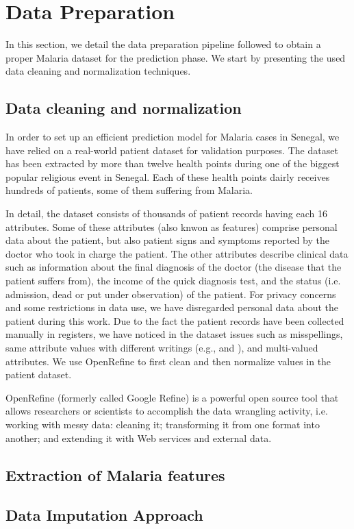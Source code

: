 \section{Data Preparation}\label{data_prep}
In this section, we detail the data preparation pipeline followed to obtain a proper Malaria dataset for the prediction phase.
We start by presenting the used data cleaning and normalization techniques.


\subsection{Data cleaning and normalization}
In order to set up an efficient prediction model for Malaria cases in Senegal, we have relied on a real-world patient dataset
for validation purposes. The dataset has been extracted by more than twelve health points during one of the biggest 
popular religious event in Senegal. Each of these health points dairly receives hundreds of patients, some of them 
suffering from Malaria. 

In detail, the dataset consists of thousands of patient records having each 16 attributes. Some of these
attributes (also knwon as features) comprise personal data about the patient, but also patient signs and symptoms
reported by the doctor who took in charge the patient. The other attributes describe clinical data such as information about the final diagnosis
of the doctor (the disease that the patient suffers from), the income of the quick diagnosis test, and the status (i.e. admission, 
dead or put under observation) of the patient. For privacy concerns and some restrictions in data use, we have disregarded personal data about
the patient during this work. Due to the fact the patient records have been collected manually in registers, we have noticed in the dataset issues
such as misspellings, same attribute values with different writings (e.g.,  and ),
 and multi-valued attributes. We use OpenRefine \cite{Ku16,openRefine} to first clean and then normalize values in the patient dataset.

OpenRefine (formerly called Google Refine) is a powerful open source tool that allows researchers or scientists to accomplish the data wrangling activity, i.e. 
working with messy data: cleaning it; transforming it from one format into another; and extending it with Web services and external data.    


\subsection{Extraction of Malaria features}


\subsection{Data Imputation Approach} 
